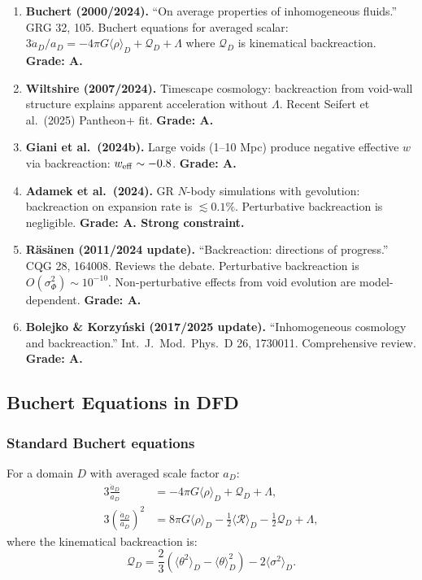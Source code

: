 \documentclass[11pt,a4paper]{article}
\begin{document}
\begin{enumerate}
\item \textbf{Buchert (2000/2024).} ``On average properties of inhomogeneous fluids.'' GRG 32, 105. Buchert equations for averaged scalar:
$3\ddot{a}_D/a_D = -4\pi G\langle\rho\rangle_D + \mathcal{Q}_D + \Lambda$ where $\mathcal{Q}_D$ is kinematical backreaction. \textbf{Grade: A.}

\item \textbf{Wiltshire (2007/2024).} Timescape cosmology: backreaction from void-wall structure explains apparent acceleration without $\Lambda$. Recent Seifert et al.\ (2025) Pantheon+ fit. \textbf{Grade: A.}

\item \textbf{Giani et al.\ (2024b).} Large voids (1--10 Mpc) produce negative effective $w$ via backreaction: $w_{\rm eff} \sim -0.8$. \textbf{Grade: A.}

\item \textbf{Adamek et al.\ (2024).} GR $N$-body simulations with gevolution: backreaction on expansion rate is $\lesssim 0.1\%$. Perturbative backreaction is negligible. \textbf{Grade: A. Strong constraint.}

\item \textbf{R\"as\"anen (2011/2024 update).} ``Backreaction: directions of progress.'' CQG 28, 164008. Reviews the debate. Perturbative backreaction is $O(\sigma_\Phi^2) \sim 10^{-10}$. Non-perturbative effects from void evolution are model-dependent. \textbf{Grade: A.}

\item \textbf{Bolejko \& Korzy\'nski (2017/2025 update).} ``Inhomogeneous cosmology and backreaction.'' Int.\ J.\ Mod.\ Phys.\ D 26, 1730011. Comprehensive review. \textbf{Grade: A.}
\end{enumerate}

\subsection{Buchert Equations in DFD}

\subsubsection{Standard Buchert equations}

For a domain $D$ with averaged scale factor $a_D$:
\begin{align}
3\frac{\ddot{a}_D}{a_D} &= -4\pi G\langle\rho\rangle_D + \mathcal{Q}_D + \Lambda, \label{eq:Buchert1}\\
3\left(\frac{\dot{a}_D}{a_D}\right)^2 &= 8\pi G\langle\rho\rangle_D - \frac{1}{2}\langle\mathcal{R}\rangle_D - \frac{1}{2}\mathcal{Q}_D + \Lambda, \label{eq:Buchert2}
\end{align}
where the kinematical backreaction is:
\begin{equation}
\mathcal{Q}_D = \frac{2}{3}\left(\langle\theta^2\rangle_D - \langle\theta\rangle_D^2\right) - 2\langle\sigma^2\rangle_D.
\end{equation}
\end{document}

